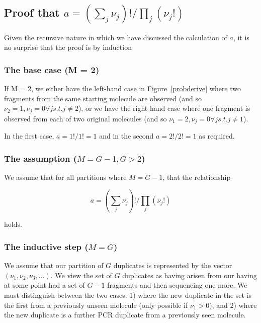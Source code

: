 \documentclass{article}
\begin{document}
\subsection{Proof that $a = \left( \sum_j  \nu_j \right)!/\prod_j \left( \nu_j! \right)$}

Given the recursive nature in which we have discussed the calculation of $a$, it is no surprise that the proof is by induction

\subsubsection{The base case (M = 2)}

If M = 2, we either have the left-hand case in Figure~\ref{probderive} where two fragments from the same starting molecule are observed (and so $\nu_2=1, \nu_j =0 \forall j s.t. j \neq 2$), or we have the right hand case where one fragment is observed from each of two original molecules (and so $\nu_1=2, \nu_j =0 \forall j s.t. j \neq 1$).

In the first case, $a = 1!/1! = 1$ and in the second $a = 2!/2! = 1$ as required.


\subsubsection{The assumption ($M = G-1, G>2$)}

We assume that for all partitions where $M = G-1$, that the relationship 

\begin{equation}
a = \left( \sum_j  \nu_j \right)!/\prod_j \left( \nu_j! \right)
\end{equation}

\noindent holds.

\subsubsection{The inductive step ($M = G$)}

We assume that our partition of $G$ duplicates is represented by the vector $(\nu_1, \nu_2, \nu_3, ...)$. We view the set of $G$ duplicates as having arisen from our having at some point had a set of $G-1$ fragments and then sequencing one more. We must distinguish between the two cases: 1) where the new duplicate in the set is the first from a previously unseen molecule (only possible if $\nu_1>0$), and 2) where the new duplicate is a further PCR duplicate from a previously seen molecule.
\end{document}
